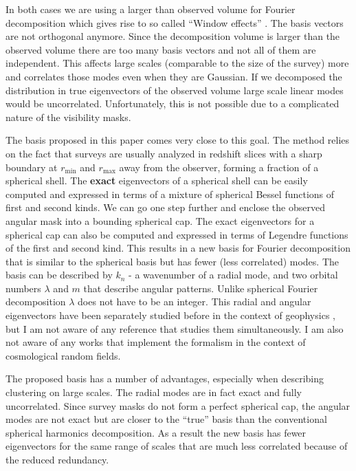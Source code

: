 \documentclass[fleqn,usenatbib]{mnras}
\newcommand{\rmin}{r_\mathrm{min}}
\newcommand{\rmax}{r_\mathrm{max}}
\begin{document}
In both cases we are using a larger than observed volume for Fourier
decomposition which gives rise to so called ``Window effects''
\citep[see e.g.,][]{2017MNRAS.464.3121W}. The basis vectors are not orthogonal anymore.
Since the decomposition volume is larger than the observed volume there are too
many basis vectors and not all of them are independent. This affects large
scales (comparable to the size of the survey) more and correlates those modes
even when they are Gaussian. If we decomposed the distribution in true
eigenvectors of the observed volume large scale linear modes would be
uncorrelated. Unfortunately, this is not possible due to a complicated nature
of the visibility masks.

The basis proposed in this paper comes very close to this goal. The method
relies on the fact that surveys are usually analyzed in redshift slices with a
sharp boundary at $\rmin$ and $\rmax$ away from the observer, forming a
fraction of a spherical shell. The \textbf{exact} eigenvectors of a spherical
shell can be easily computed and expressed in terms of a mixture of spherical
Bessel functions of first and second kinds. We can go one step further and
enclose the observed angular mask into a bounding spherical cap. The exact
eigenvectors for a spherical cap can also be computed and expressed in terms of
Legendre functions of the first and second kind. This results in a new basis
for Fourier decomposition that is similar to the spherical basis but has fewer
(less correlated) modes. The basis can be described by $k_n$ - a wavenumber of
a radial mode, and two orbital numbers $\lambda$ and $m$ that describe angular
patterns. Unlike spherical Fourier decomposition $ \lambda$ does not have to
be an integer. This radial and angular eigenvectors have been separately
studied before in the context of geophysics
\citep{1985JGR....90.2583H,2006JGRB..111.1102T,Mushref2010}, but I am not aware
of any reference that studies them simultaneously. I am also not aware of any
works that implement the formalism in the context of cosmological random
fields.

The proposed basis has a number of advantages, especially when describing
clustering on large scales. The radial modes are in fact exact and fully
uncorrelated. Since survey masks do not form a perfect spherical cap, the
angular modes are not exact but are closer to the ``true'' basis than the
conventional spherical harmonics decomposition. As a result the new basis has
fewer eigenvectors for the same range of scales that are much less correlated
because of the reduced redundancy.
\end{document}
